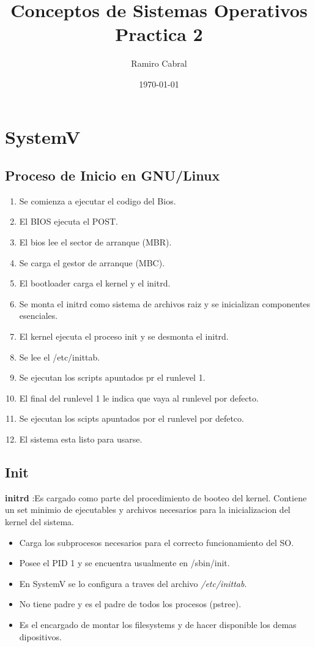 \documentclass[11pt]{article}
\title{\Huge{Conceptos de Sistemas Operativos\\
Practica 2}}
\author{\huge{Ramiro Cabral}}
\date{\today}
\begin{document}
\maketitle
\pagebreak

\section{SystemV}
\subsection{Proceso de Inicio en GNU/Linux}
\begin{enumerate}
    \item Se comienza a ejecutar el codigo del Bios.
    \item El BIOS ejecuta el POST.
    \item El bios lee el sector de arranque (MBR).
    \item Se carga el gestor de arranque (MBC).
    \item El bootloader carga el kernel y el initrd.
    \item Se monta el initrd como sistema de archivos raiz y se inicializan componentes esenciales.
    \item El kernel ejecuta el proceso init y se desmonta el initrd.
    \item Se lee el /etc/inittab.
    \item Se ejecutan los scripts apuntados pr el runlevel 1.
    \item El final del runlevel 1 le indica que vaya al runlevel por defecto.
    \item Se ejecutan los scipts apuntados por el runlevel por defetco.
    \item El sistema esta listo para usarse.
\end{enumerate}

\subsection{Init}
\textbf{initrd} :Es cargado como parte del procedimiento de booteo del kernel. Contiene un set minimio de ejecutables y archivos necesarios para la inicializacion del kernel del sistema.
\begin{itemize}
    \item Carga los subprocesos necesarios para el correcto funcionamiento del SO.
    \item Posee el PID 1 y se encuentra usualmente en /sbin/init.
    \item En SystemV se lo configura a traves del archivo \textit{/etc/inittab}.
    \item No tiene padre y es el padre de todos los procesos (pstree).
    \item Es el encargado de montar los filesystems y de hacer disponible los demas dipositivos.
\end{itemize}
\end{document}
